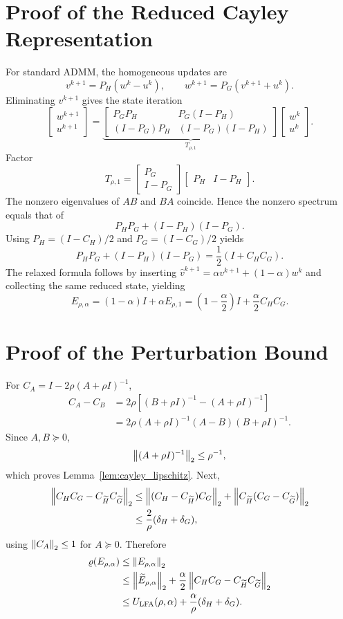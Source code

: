 \documentclass[pdflatex,iicol,sn-mathphys-num]{sn-jnl}
\theoremstyle{definition}\newtheorem{definition}[theorem]{Definition}\newtheorem{remark}[theorem]{Remark}
\begin{document}
\appendix
\section{Proof of the Reduced Cayley Representation}\label{app:reduced}
For standard ADMM, the homogeneous updates are
\[
v^{k+1}=P_H(w^k-u^k),
\qquad
w^{k+1}=P_G(v^{k+1}+u^k).
\]
Eliminating $v^{k+1}$ gives the state iteration
\[
\begin{bmatrix}w^{k+1}\\u^{k+1}\end{bmatrix}
=
\underbrace{\begin{bmatrix}
P_GP_H&P_G(I-P_H)\\
(I-P_G)P_H&(I-P_G)(I-P_H)
\end{bmatrix}}_{T_{\rho,1}}
\begin{bmatrix}w^k\\u^k\end{bmatrix}.
\]
Factor
\[
T_{\rho,1}
=
\begin{bmatrix}P_G\\I-P_G\end{bmatrix}
\begin{bmatrix}P_H&I-P_H\end{bmatrix}.
\]
The nonzero eigenvalues of $AB$ and $BA$ coincide. Hence the nonzero spectrum equals that of
\[
P_HP_G+(I-P_H)(I-P_G).
\]
Using $P_H=(I-C_H)/2$ and $P_G=(I-C_G)/2$ yields
\[
P_HP_G+(I-P_H)(I-P_G)=\frac12(I+C_HC_G).
\]
The relaxed formula follows by inserting $\widehat v^{k+1}=\alpha v^{k+1}+(1-\alpha)w^k$ and collecting the same reduced state, yielding
\[
E_{\rho,\alpha}=(1-\alpha)I+\alpha E_{\rho,1}
=\left(1-\frac\alpha2\right)I+\frac\alpha2 C_HC_G.
\]

\section{Proof of the Perturbation Bound}\label{app:perturbation}
For $C_A=I-2\rho(A+\rho I)^{-1}$,
\begin{align*}
C_A-C_B
&=2\rho\left[(B+\rho I)^{-1}-(A+\rho I)^{-1}\right]\\
&=2\rho(A+\rho I)^{-1}(A-B)(B+\rho I)^{-1}.
\end{align*}
Since $A,B\succeq0$,
\[
\left\lVert (A+\rho I)^{-1}\right\rVert_2\le\rho^{-1},
\]
which proves Lemma~\ref{lem:cayley_lipschitz}. Next,
\begin{align*}
\left\lVert C_HC_G-C_{\widetilde H}C_{\widetilde G}\right\rVert_2
&\le
\left\lVert (C_H-C_{\widetilde H})C_G\right\rVert_2
+\left\lVert C_{\widetilde H}(C_G-C_{\widetilde G})\right\rVert_2\\
&\le\frac{2}{\rho}(\delta_H+\delta_G),
\end{align*}
using $\left\lVert C_A\right\rVert_2\le1$ for $A\succeq0$. Therefore
\begin{align*}
\varrho(E_{\rho,\alpha})
&\le\left\lVert E_{\rho,\alpha}\right\rVert_2\\
&\le\left\lVert \widetilde E_{\rho,\alpha}\right\rVert_2
+\frac{\alpha}{2}
\left\lVert C_HC_G-C_{\widetilde H}C_{\widetilde G}\right\rVert_2\\
&\le U_{\mathrm{LFA}}(\rho,\alpha)
+\frac{\alpha}{\rho}(\delta_H+\delta_G).
\end{align*}
\end{document}
